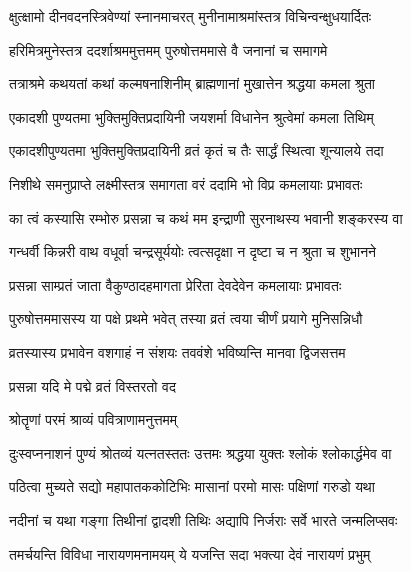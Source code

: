 \twolineshloka
{क्षुत्क्षामो दीनवदनस्त्रिवेण्यां स्नानमाचरत्}
{मुनीनामाश्रमांस्तत्र विचिन्वन्क्षुधयार्दितः}%

\twolineshloka
{हरिमित्रमुनेस्तत्र ददर्शाश्रममुत्तमम्}
{पुरुषोत्तममासे वै जनानां च समागमे}%

\twolineshloka
{तत्राश्रमे कथयतां कथां कल्मषनाशिनीम्}
{ब्राह्मणानां मुखात्तेन श्रद्धया कमला श्रुता}%

\twolineshloka
{एकादशी पुण्यतमा भुक्तिमुक्तिप्रदायिनी}
{जयशर्मा विधानेन श्रुत्वेमां कमला तिथिम्}%

\twolineshloka
{एकादशीपुण्यतमा भुक्तिमुक्तिप्रदायिनी}
{व्रतं कृतं च तैः सार्द्धं स्थित्वा शून्यालये तदा}%

\twolineshloka
{निशीथे समनुप्राप्ते लक्ष्मीस्तत्र समागता}
{वरं ददामि भो विप्र कमलायाः प्रभावतः}%


\twolineshloka
{का त्वं कस्यासि रम्भोरु प्रसन्ना च कथं मम}
{इन्द्राणी सुरनाथस्य भवानी शङ्करस्य वा}%

\twolineshloka
{गन्धर्वी किन्नरी वाथ वधूर्वा चन्द्रसूर्ययोः}
{त्वत्सदृक्षा न दृष्टा च न श्रुता च शुभानने}%


\twolineshloka
{प्रसन्ना साम्प्रतं जाता वैकुण्ठादहमागता}
{प्रेरिता देवदेवेन कमलायाः प्रभावतः}%

\twolineshloka
{पुरुषोत्तममासस्य या पक्षे प्रथमे भवेत्}
{तस्या व्रतं त्वया चीर्णं प्रयागे मुनिसन्निधौ}%

\twolineshloka
{व्रतस्यास्य प्रभावेन वशगाहं न संशयः}
{तववंशे भविष्यन्ति मानवा द्विजसत्तम}%

\onelineshloka
{प्रसन्ना यदि मे पद्मे व्रतं विस्तरतो वद}%

\onelineshloka
{श्रोतॄणां परमं श्राव्यं पवित्राणामनुत्तमम्}%

\twolineshloka
{दुःस्वप्ननाशनं पुण्यं श्रोतव्यं यत्नतस्ततः}
{उत्तमः श्रद्धया युक्तः श्लोकं श्लोकार्द्धमेव वा}%

\twolineshloka
{पठित्वा मुच्यते सद्यो महापातककोटिभिः}
{मासानां परमो मासः पक्षिणां गरुडो यथा}%

\twolineshloka
{नदीनां च यथा गङ्गा तिथीनां द्वादशी तिथिः}
{अद्यापि निर्जराः सर्वे भारते जन्मलिप्सवः}%

\twolineshloka
{तमर्चयन्ति विविधा नारायणमनामयम्}
{ये यजन्ति सदा भक्त्या देवं नारायणं प्रभुम्}%

